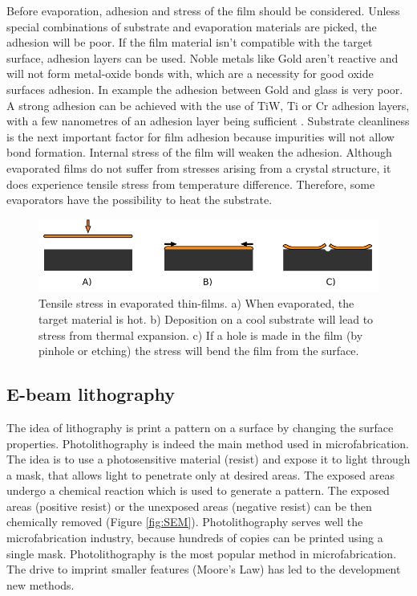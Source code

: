 \documentclass[final]{jyflluk}
\begin{document}
Before evaporation, adhesion and stress of the film should be considered. Unless special combinations of substrate and evaporation materials are picked, the adhesion will be poor. If the film material isn’t compatible with the target surface, adhesion layers can be used. Noble metals like Gold aren’t reactive and will not form metal-oxide bonds with, which are a necessity for good oxide surfaces adhesion. In example the adhesion between Gold and glass is very poor. A strong adhesion can be achieved with the use of $\mathrm{TiW}$, $\mathrm{Ti}$ or $\mathrm{Cr}$ adhesion layers, with a few nanometres of an adhesion layer being sufficient \cite{chen2013study}. Substrate cleanliness is the next important factor for film adhesion because impurities will not allow bond formation. Internal stress of the film will weaken the adhesion. Although evaporated films do not suffer from stresses arising from a crystal structure, it does experience tensile stress from temperature difference.  Therefore, some evaporators have the possibility to heat the substrate. \cite{franssila2010introduction}

\begin{figure}[h]
    \centering
    \includegraphics[width=1.0\textwidth]{images/tensile.pdf}
    \caption{Tensile stress in evaporated thin-films. a) When evaporated, the target material is hot. b) Deposition on a cool substrate will lead to stress from thermal expansion. c) If a hole is made in the film (by pinhole or etching) the stress will bend the film from the surface.}
    \label{fig:stresa}
\end{figure}

\subsection{E-beam lithography}
\label{sec:xx3}

The idea of lithography is print a pattern on a surface by changing the surface properties.  Photolithography is indeed the main method used in microfabrication. The idea is to use a photosensitive material (resist) and expose it to light through a mask, that allows light to penetrate only at desired areas. The exposed areas undergo a chemical reaction which is used to generate a pattern. The exposed areas (positive resist) or the unexposed areas (negative resist) can be then chemically removed (Figure \ref{fig:SEM}).  Photolithography serves well the microfabrication industry, because hundreds of copies can be printed using a single mask. Photolithography is the most popular method in microfabrication. The drive to imprint smaller features (Moore’s Law) has led to the development new methods.
\cite{franssila2010introduction, lee2010microfabrication}
\end{document}
